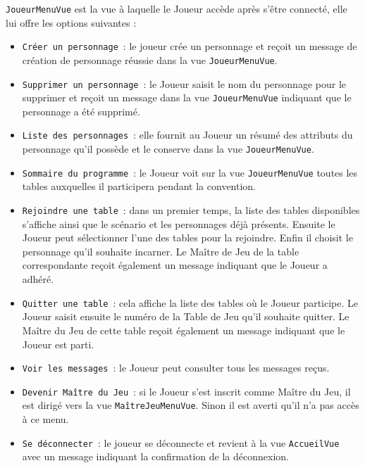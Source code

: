 \documentclass[11pt]{article}
\begin{document}
\texttt{JoueurMenuVue} est la vue à laquelle le Joueur accède après s'être connecté, elle lui offre les options suivantes :
\begin{itemize}[label=, font=\small]
    \item\texttt{Créer un personnage}~: le joueur crée un personnage et reçoit un message de création de personnage réussie dans la vue \texttt{JoueurMenuVue}.
    \item\texttt{Supprimer un personnage}~: le Joueur saisit le nom du personnage pour le supprimer et reçoit un message dans la vue \texttt{JoueurMenuVue} indiquant que le personnage a été supprimé.
    \item\texttt{Liste des personnages}~: elle fournit au Joueur un résumé des attributs du personnage qu'il possède et le conserve dans la vue \texttt{JoueurMenuVue}.
    \item\texttt{Sommaire du programme}~: le Joueur voit sur la vue \texttt{JoueurMenuVue} toutes les tables auxquelles il participera pendant la convention.
    \item\texttt{Rejoindre une table}~: dans un premier temps, la liste des tables disponibles s'affiche ainsi que le scénario et les personnages déjà présents. Ensuite le Joueur peut sélectionner l'une des tables pour la rejoindre. Enfin il choisit le personnage qu'il souhaite incarner. Le Maître de Jeu de la table correspondante reçoit également un message indiquant que le Joueur a adhéré.
    \item\texttt{Quitter une table}~: cela affiche la liste des tables où le Joueur participe. Le Joueur saisit ensuite le numéro de la Table de Jeu qu'il souhaite quitter. Le Maître du Jeu de cette table reçoit également un message indiquant que le Joueur est parti.
    \item\texttt{Voir les messages}~: le Joueur peut consulter tous les messages reçus.
    \item\texttt{Devenir Maître du Jeu}~: si le Joueur s'est inscrit comme Maître du Jeu, il est dirigé vers la vue \texttt{MaîtreJeuMenuVue}. Sinon il est averti qu'il n'a pas accès à ce menu.
    \item\texttt{Se déconnecter}~: le joueur se déconnecte et revient à la vue \texttt{AccueilVue} avec un message indiquant la confirmation de la déconnexion.
\end{itemize}
\end{document}
